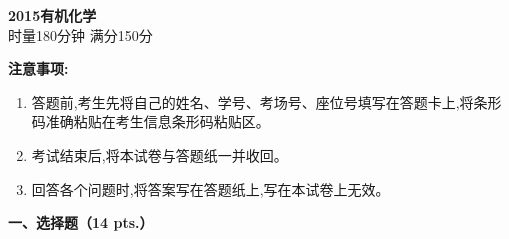 \begin{center}
    {\LARGE \textbf{2015有机化学}} \\[2ex]
    {\large 时量180分钟 \quad 满分150分}
\end{center}

\vspace{0.5cm}
\noindent\textbf{注意事项:}
\begin{enumerate}[label=\arabic*., parsep=0pt, itemsep=0pt]
    \item 答题前,考生先将自己的姓名、学号、考场号、座位号填写在答题卡上,将条形码准确粘贴在考生信息条形码粘贴区。
    \item 考试结束后,将本试卷与答题纸一并收回。
    \item 回答各个问题时,将答案写在答题纸上,写在本试卷上无效。
\end{enumerate}

\vspace{0.5cm}
\noindent\textbf{一、选择题（14 pts.）}

